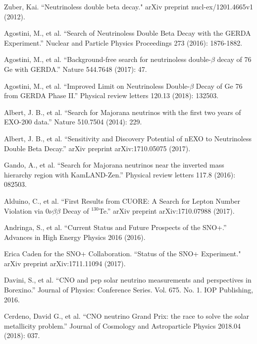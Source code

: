 \documentclass[preprint,12pt]{elsarticle}
\numberwithin{equation}{section}
\begin{document}
\begin{thebibliography}{00}


 Zuber, Kai. ``Neutrinoless double beta decay." arXiv preprint nucl-ex/1201.4665v1 (2012).

 Agostini, M., et al. ``Search of Neutrinoless Double Beta Decay with the GERDA Experiment.'' Nuclear and Particle Physics Proceedings 273 (2016): 1876-1882. 

 Agostini, M., et al. ``Background-free search for neutrinoless double-$\beta$ decay of 76 Ge with GERDA.'' Nature 544.7648 (2017): 47.

 Agostini, M., et al. ``Improved Limit on Neutrinoless Double-$\beta$ Decay of Ge 76 from GERDA Phase II.'' Physical review letters 120.13 (2018): 132503.

 Albert, J. B., et al. ``Search for Majorana neutrinos with the first two years of EXO-200 data.'' Nature 510.7504 (2014): 229.

 Albert, J. B., et al. ``Sensitivity and Discovery Potential of nEXO to Neutrinoless Double Beta Decay.'' arXiv preprint arXiv:1710.05075 (2017).


 Gando, A., et al. ``Search for Majorana neutrinos near the inverted mass hierarchy region with KamLAND-Zen.'' Physical review letters 117.8 (2016): 082503.

 Alduino, C., et al. ``First Results from CUORE: A Search for Lepton Number Violation via $0\nu\beta\beta$ Decay of $^{130}$Te.'' arXiv preprint arXiv:1710.07988 (2017).

 Andringa, S., et al. ``Current Status and Future Prospects of the SNO+.'' Advances in High Energy Physics 2016 (2016).

 Erica Caden for the SNO+ Collaboration. ``Status of the SNO+ Experiment." arXiv preprint arXiv:1711.11094 (2017).

 Davini, S., et al. ``CNO and pep solar neutrino measurements and perspectives in Borexino.'' Journal of Physics: Conference Series. Vol. 675. No. 1. IOP Publishing, 2016.

 Cerdeno, David G., et al. ``CNO neutrino Grand Prix: the race to solve the solar metallicity problem.'' Journal of Cosmology and Astroparticle Physics 2018.04 (2018): 037.


\end{thebibliography}
\end{document}
